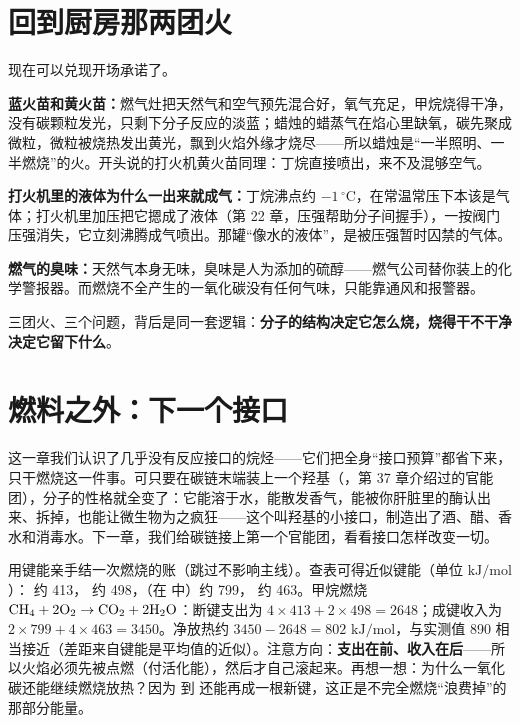 \section{回到厨房那两团火}

现在可以兑现开场承诺了。

\textbf{蓝火苗和黄火苗：}燃气灶把天然气和空气预先混合好，氧气充足，甲烷烧得干净，没有碳颗粒发光，只剩下分子反应的淡蓝；蜡烛的蜡蒸气在焰心里缺氧，碳先聚成微粒，微粒被烧热发出黄光，飘到火焰外缘才烧尽——所以蜡烛是“一半照明、一半燃烧”的火。开头说的打火机黄火苗同理：丁烷直接喷出，来不及混够空气。

\textbf{打火机里的液体为什么一出来就成气：}丁烷沸点约 $-1\,^{\circ}\mathrm{C}$，在常温常压下本该是气体；打火机里加压把它摁成了液体（第 22 章，压强帮助分子间握手），一按阀门压强消失，它立刻沸腾成气喷出。那罐“像水的液体”，是被压强暂时囚禁的气体。

\textbf{燃气的臭味：}天然气本身无味，臭味是人为添加的硫醇——燃气公司替你装上的化学警报器。而燃烧不全产生的一氧化碳没有任何气味，只能靠通风和报警器。

三团火、三个问题，背后是同一套逻辑：\textbf{分子的结构决定它怎么烧，烧得干不干净决定它留下什么}。

\section{燃料之外：下一个接口}

这一章我们认识了几乎没有反应接口的烷烃——它们把全身“接口预算”都省下来，只干燃烧这一件事。可只要在碳链末端装上一个羟基（，第 37 章介绍过的官能团），分子的性格就全变了：它能溶于水，能散发香气，能被你肝脏里的酶认出来、拆掉，也能让微生物为之疯狂——这个叫羟基的小接口，制造出了酒、醋、香水和消毒水。下一章，我们给碳链接上第一个官能团，看看接口怎样改变一切。

\begin{tiaozhan}
用键能亲手结一次燃烧的账（跳过不影响主线）。查表可得近似键能（单位 $\mathrm{kJ/mol}$）： 约 413， 约 498，（在  中）约 799， 约 463。甲烷燃烧 $\mathrm{CH_4} + \mathrm{2O_2} \rightarrow \mathrm{CO_2} + \mathrm{2H_2O}$：断键支出为 $4\times 413 + 2\times 498 = 2648$；成键收入为 $2\times 799 + 4\times 463 = 3450$。净放热约 $3450-2648=802$ $\mathrm{kJ/mol}$，与实测值 890 相当接近（差距来自键能是平均值的近似）。注意方向：\textbf{支出在前、收入在后}——所以火焰必须先被点燃（付活化能），然后才自己滚起来。再想一想：为什么一氧化碳还能继续燃烧放热？因为  到  还能再成一根新键，这正是不完全燃烧“浪费掉”的那部分能量。
\end{tiaozhan}

